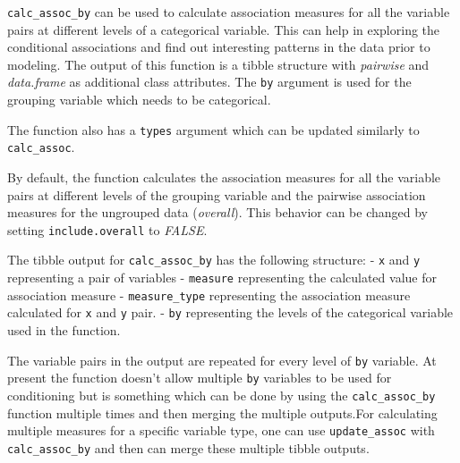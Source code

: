 \texttt{calc\_assoc\_by} can be used to calculate association measures
for all the variable pairs at different levels of a categorical
variable. This can help in exploring the conditional associations and
find out interesting patterns in the data prior to modeling. The output
of this function is a tibble structure with \emph{pairwise} and
\emph{data.frame} as additional class attributes. The \texttt{by}
argument is used for the grouping variable which needs to be
categorical.

The function also has a \texttt{types} argument which can be updated
similarly to \texttt{calc\_assoc}.

\begin{Schunk}
\end{Schunk}

By default, the function calculates the association measures for all the
variable pairs at different levels of the grouping variable and the
pairwise association measures for the ungrouped data (\emph{overall}).
This behavior can be changed by setting \texttt{include.overall} to
\emph{FALSE}.

The tibble output for \texttt{calc\_assoc\_by} has the following
structure: - \texttt{x} and \texttt{y} representing a pair of variables
- \texttt{measure} representing the calculated value for association
measure - \texttt{measure\_type} representing the association measure
calculated for \texttt{x} and \texttt{y} pair. - \texttt{by}
representing the levels of the categorical variable used in the
function.

The variable pairs in the output are repeated for every level of
\texttt{by} variable. At present the function doesn't allow multiple
\texttt{by} variables to be used for conditioning but is something which
can be done by using the \texttt{calc\_assoc\_by} function multiple
times and then merging the multiple outputs.For calculating multiple
measures for a specific variable type, one can use
\texttt{update\_assoc} with \texttt{calc\_assoc\_by} and then can merge
these multiple tibble outputs.

